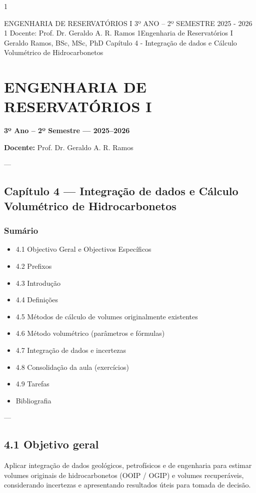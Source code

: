 \documentclass[11pt,a4paper]{article}
\begin{document}
1



ENGENHARIA DE RESERVATÓRIOS I
3º ANO – 2º SEMESTRE
2025 - 2026
1
Docente: Prof. Dr. Geraldo A. R. Ramos
1Engenharia de Reservatórios I
Geraldo Ramos, BSc, MSc, PhD
Capítulo 4 - Integração de dados e Cálculo Volumétrico de Hidrocarbonetos
\section{ENGENHARIA DE RESERVATÓRIOS I}
 \textbf{3º Ano – 2º Semestre — 2025–2026}

 \textbf{Docente:} Prof. Dr. Geraldo A. R. Ramos

 ---

\subsection{Capítulo 4 — Integração de dados e Cálculo Volumétrico de Hidrocarbonetos}

\subsubsection{Sumário}
\begin{itemize}
\item 4.1 Objectivo Geral e Objectivos Específicos
\item 4.2 Prefixos
\item 4.3 Introdução
\item 4.4 Definições
\item 4.5 Métodos de cálculo de volumes originalmente existentes
\item 4.6 Método volumétrico (parâmetros e fórmulas)
\item 4.7 Integração de dados e incertezas
\item 4.8 Consolidação da aula (exercícios)
\item 4.9 Tarefas
\item Bibliografia
\end{itemize}

 ---

\subsection{4.1 Objetivo geral}
Aplicar integração de dados geológicos, petrofísicos e de engenharia para estimar volumes originais de hidrocarbonetos (OOIP / OGIP) e volumes recuperáveis, considerando incertezas e apresentando resultados úteis para tomada de decisão.
\end{document}
